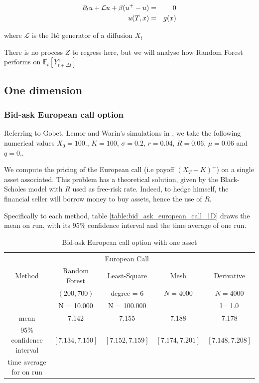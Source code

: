 \documentclass[english,11pt,openany]{article}
\theoremstyle{definition}
\newcommand{\E}{\mathbb{E}}
\theoremstyle{plain}
\theoremstyle{definition}
\begin{document}
	\begin{eqnarray}
	\partial_t u + \mathcal{L}u + \beta(u^+ -u) &=& 0 \notag \\
	u(T, x) &=& g(x) \notag
	\end{eqnarray}
	
	where $\mathcal{L}$ is the Itô generator of a diffusion $X_t$
	
	There is no process $Z$ to regress here, but we will analyse how Random Forest performs on $\E_t[Y_{t+ \Delta t}^+]$ 
	
	
	
	\subsection{One dimension}
	
	\subsubsection{Bid-ask European call option}
	\newpage 
	
	Referring to Gobet, Lemor and Warin's simulations in \cite{gobet:example}, we take the following numerical values $X_0 = 100.$, $K=100$, $\sigma=0.2$, $r=0.04$, $R=0.06$, $\mu = 0.06$ and $q = 0.$. 
	
	We compute the pricing of the European call (i.e payoff $(X_T - K)^+$) on a single asset associated. This problem has a theoretical solution, given by the Black-Scholes model with $R$ used as free-risk rate. 
	Indeed, to hedge himself, the financial seller will borrow money to buy assets, hence the use of $R$. 
	
	
	
	
	
	Specifically to each method, table \eqref{table:bid_ask_european_call_1D} draws the mean on run, with its 95\% confidence interval and the time average of one run. 
	\begin{table}[H]
		\centering
		\caption{Bid-ask European call option with one asset}\label{table:bid_ask_european_call_1D}
		\begin{tabular}{*5c}
			\toprule
			& \multicolumn{3}{c}{European Call} \\
			\cmidrule(lr){2-5}
			Method & Random Forest  & Least-Square & Mesh & Derivative \\    
			& $(200, 700)$ & degree = $6$     & $N = 4 000$ &  $N = 4 000$ \\
			& N = 10.000 & N = 100.000     &  &  l= 1.0\\
			\midrule
			mean &     7.142   & 7.155  &  7.188  &  7.178 \\ 
			95\% confidence interval &   $[7.134, 7.150]$     &    $[7.152, 7.159]$     & $[7.174, 7.201]$ & $[7.148, 7.208]$  \\
			time average for on run &        &  &  &  \\
			\bottomrule
		\end{tabular}
	\end{table}
	
\end{document}
